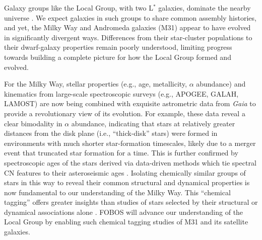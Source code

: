 \documentclass[11pt,a4paper,twoside,onecolumn,openany,final,oldfontcommands]{memoir}
\begin{document}
Galaxy groups like the Local Group, with two L$^*$ galaxies, dominate the nearby universe \citep{kourkchi17}.  We expect galaxies in such groups to share common assembly histories, and yet, the Milky Way and Andromeda galaxies (M31) appear to have evolved in significantly divergent ways.  Differences from their star-cluster populations to their dwarf-galaxy properties remain poorly understood, limiting progress towards building a complete picture for how the Local Group formed and evolved.

For the Milky Way, stellar properties (e.g., age, metallicity, $\alpha$ abundance) and kinematics from large-scale spectroscopic surveys (e.g., APOGEE, GALAH, LAMOST) are now being combined with exquisite astrometric data from \textit{Gaia} to provide a revolutionary view of its evolution.  For example, these data reveal a clear bimodality in $\alpha$ abundance, indicating that stars at relatively greater distances from the disk plane (i.e., ``thick-disk'' stars) were formed in environments with much shorter star-formation timescales, likely due to a merger event that truncated star formation for a time. This is further confirmed by spectroscopic ages of the stars derived via data-driven methods which tie spectral CN features to their asteroseismic ages \citep[e.g.][]{Martig16}.  Isolating chemically similar groups of stars in this way to reveal their common structural and dynamical properties is now fundamental to our understanding of the Milky Way.  This ``chemical tagging'' offers greater insights than studies of stars selected by their structural or dynamical associations alone \citep[e.g.,][]{Ting15}.  FOBOS will advance our understanding of the Local Group by enabling such chemical tagging studies of M31 and its satellite galaxies.
\end{document}

